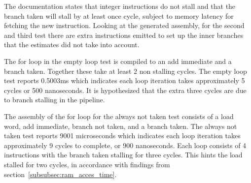 \documentclass{article}
\begin{document}


The documentation states that integer instructions do not stall and that the branch taken will stall by at least once cycle, subject to memory latency for fetching the new instruction. Looking at the generated assembly, for the second and third test there are extra instructions emitted to set up the inner branches that the estimates did not take into account.


The for loop in the empty loop test is compiled to an add immediate and a branch taken. Together these take at least 2 non stalling cycles. The empty loop test reports 0.5003ms which indicates each loop iteration takes approximately 5 cycles or 500 nanoseconds. It is hypothesized that the extra three cycles are due to branch stalling in the pipeline.


The assembly of the for loop for the always not taken test consists of a load word, add immediate, branch not taken, and a branch taken. The always not taken test reports 9001 microseconds which indicates each loop iteration takes approximately 9 cycles to complete, or 900 nanoseconds. Each loop consists of 4 instructions with the branch taken stalling for three cycles. This hints the load stalled for two cycles, in accordance with findings from section~\ref{subsubsec:ram_acces_time}.
\end{document}
